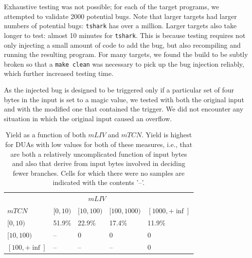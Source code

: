 Exhaustive testing was not possible; for each of the target programs, we attempted to validate 2000 potential bugs. 
Note that larger targets had larger numbers of potential bugs: \verb+tshark+ has over a million.
Larger targets also take longer to test: almost 10 minutes for \verb+tshark+.
This is because testing requires not only injecting a small amount of code to add the bug, but also recompiling and running the resulting program.
For many targets, we found the build to be subtly broken so that a \verb+make clean+ was necessary to pick up the bug injection reliably, which further increased testing time.

As the injected bug is designed to be triggered only if a particular set of four bytes in the input is set to a magic value, we tested with both the original input and with the modified one that contained the trigger. 
We did not encounter any situation in which the original input caused an overflow.


\begin{table}[b]
\centering
\begin{tabular}{l|l|l|l|l} 
       & \multicolumn{3}{c}{$mLIV$} &  \\  
$mTCN$ &         $[0,10)$ & $[10,100)$ & $[100,1000)$ & $[1000,+\inf]$ \\  \hline 
$[0,10)$ &       51.9\%   & 22.9\%     & 17.4\%       & 11.9\%          \\
$[10,100)$ &     --       & 0          & 0            & 0     \\
$[100,+\inf]$ &  --       & --         & --           & 0     \\ 
\end{tabular}
\caption{Yield as a function of both $mLIV$ and $mTCN$.  
Yield is highest for DUAs with low values for both of these measures, i.e., that are both a relatively uncomplicated function of input bytes and also that derive from input bytes involved in deciding fewer branches.
Cells for which there were no samples are indicated with the contents '--'.}
\label{table:yield-breakdown}
\end{table}

